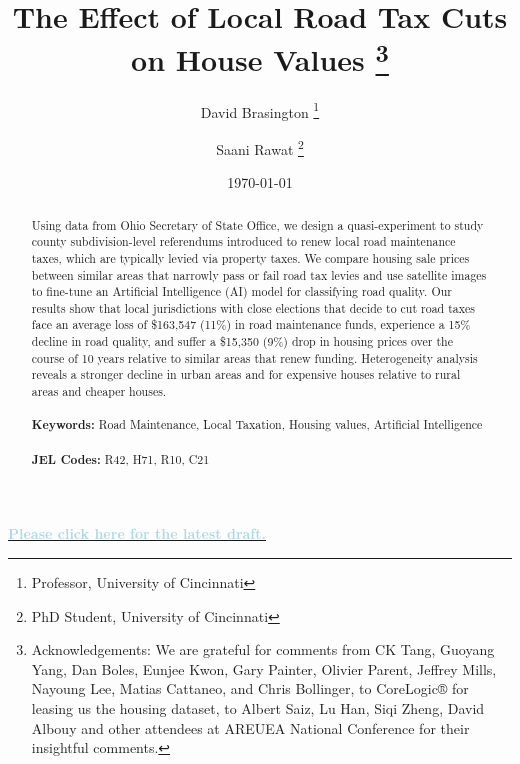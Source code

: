 \documentclass[12pt]{article}
\begin{document}
\begin{titlepage}
\title{The Effect of Local Road Tax Cuts on House Values
\thanks{Acknowledgements: We are grateful for comments from CK Tang, Guoyang Yang, Dan Boles, Eunjee Kwon, Gary Painter, Olivier Parent, Jeffrey Mills, Nayoung Lee, Matias Cattaneo, and Chris Bollinger, to CoreLogic® for leasing us the housing dataset, to Albert Saiz, Lu Han, Siqi Zheng, David Albouy and other attendees at AREUEA National Conference for their insightful comments.}}
\author{David Brasington \thanks{Professor, University of Cincinnati} \and Saani Rawat \thanks{PhD Student, University of Cincinnati}}
\date{\today} 
\maketitle

\noindent
\begin{center}
\textbf{\href{https://drive.google.com/file/d/18fS35u8sh9TMduSvmkO6O6uvLmoLFGa5/view?usp=sharing}{\textcolor{lightblue}{Please click here for the latest draft.}}}
\end{center}

\begin{abstract}
\noindent Using data from Ohio Secretary of State Office, we design a quasi-experiment to study county subdivision-level referendums introduced to renew local road maintenance taxes, which are typically levied via property taxes. We compare housing sale prices between similar areas that narrowly pass or fail road tax levies and use satellite images to fine-tune an Artificial Intelligence (AI) model for classifying road quality. Our results show that local jurisdictions with close elections that decide to cut road taxes face an average loss of \$163,547 (11\%) in road maintenance funds, experience a 15\% decline in road quality, and suffer a \$15,350 (9\%) drop in housing prices over the course of 10 years relative to similar areas that renew funding. Heterogeneity analysis reveals a stronger decline in urban areas and for expensive houses relative to rural areas and cheaper houses.
\\
\vspace{0in}\\
\noindent\textbf{Keywords:} Road Maintenance, Local Taxation, Housing values, Artificial Intelligence \\
\vspace{0in}\\
\noindent\textbf{JEL Codes:} R42, H71, R10, C21 \\

\bigskip
\end{abstract}
\setcounter{page}{0}
\thispagestyle{empty}
\end{titlepage}
\pagebreak \newpage
\end{document}
